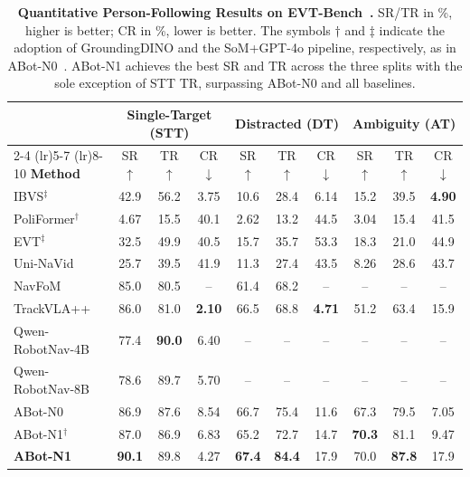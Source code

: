 \begin{table}[t]
\centering
\caption{\textbf{Quantitative Person-Following Results on EVT-Bench~\cite{wang2025trackvla}.}
SR/TR in \%, higher is better; CR in \%, lower is better. The
symbols $\dagger$ and $\ddagger$ indicate the adoption of
GroundingDINO and the SoM+GPT-4o pipeline, respectively, as in
ABot-N0~\cite{abotn0}.
ABot-N1 achieves the best SR and TR across the three splits with the sole exception of STT TR, surpassing ABot-N0 and all baselines.}
\label{tab:exp-pf}
\setlength{\tabcolsep}{3pt}
\small
\begin{tabular}{l ccc ccc ccc}
\toprule
 & \multicolumn{3}{c}{\textbf{Single-Target (STT)}} & \multicolumn{3}{c}{\textbf{Distracted (DT)}} & \multicolumn{3}{c}{\textbf{Ambiguity (AT)}} \\
\cmidrule(lr){2-4} \cmidrule(lr){5-7} \cmidrule(lr){8-10}
\textbf{Method} & SR$\uparrow$ & TR$\uparrow$ & CR$\downarrow$ & SR$\uparrow$ & TR$\uparrow$ & CR$\downarrow$ & SR$\uparrow$ & TR$\uparrow$ & CR$\downarrow$ \\
\midrule
IBVS$^{\ddagger}$~\cite{gupta2016novel}    & 42.9 & 56.2 & 3.75 & 10.6 & 28.4 & 6.14 & 15.2 & 39.5 & \textbf{4.90} \\
PoliFormer$^{\dagger}$~\cite{zeng2024poliformer} & 4.67 & 15.5 & 40.1 & 2.62 & 13.2 & 44.5 & 3.04 & 15.4 & 41.5 \\
EVT$^{\ddagger}$~\cite{zhong2024empowering}      & 32.5 & 49.9 & 40.5 & 15.7 & 35.7 & 53.3 & 18.3 & 21.0 & 44.9 \\
Uni-NaVid~\cite{zhang2024uninavid}            & 25.7 & 39.5 & 41.9 & 11.3 & 27.4 & 43.5 & 8.26 & 28.6 & 43.7 \\
NavFoM~\cite{zhang2025navfom}                 & 85.0 & 80.5 & --   & 61.4 & 68.2 & --   & --   & --   & --   \\
TrackVLA++~\cite{wang2025trackvlapp}          & 86.0 & 81.0 & \textbf{2.10} & 66.5 & 68.8 & \textbf{4.71} & 51.2 & 63.4 & 15.9 \\
Qwen-RobotNav-4B~\cite{zhang2026qwenrobotnav}                              & 77.4 & \textbf{90.0} & 6.40 & --   & --   & --   & --   & --   & --   \\
Qwen-RobotNav-8B~\cite{zhang2026qwenrobotnav}                                & 78.6 & 89.7 & 5.70 & --   & --   & --   & --   & --   & --   \\
ABot-N0~\cite{abotn0}                         & 86.9 & 87.6 & 8.54 & 66.7 & 75.4 & 11.6 & 67.3 & 79.5 & 7.05 \\
\midrule
ABot-N1$^\dagger$                      & 87.0 & 86.9 & 6.83 & 65.2 & 72.7 & 14.7 & \textbf{70.3} & 81.1 & 9.47 \\
\textbf{ABot-N1}                       & \textbf{90.1} & 89.8 & 4.27 & \textbf{67.4} & \textbf{84.4} & 17.9 & 70.0 & \textbf{87.8} & 17.9 \\
\bottomrule
\end{tabular}
\end{table}

